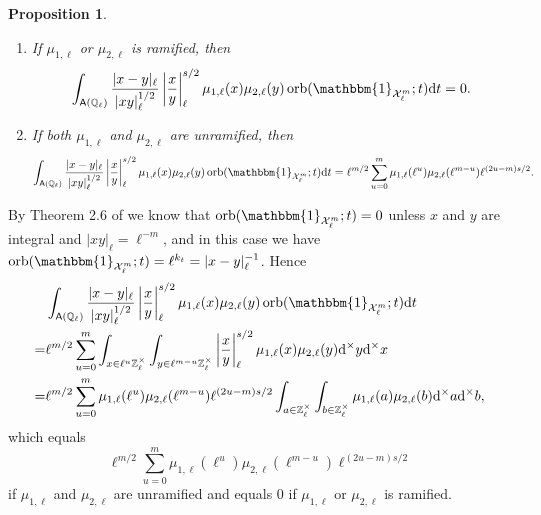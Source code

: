 \documentclass[10pt,oneside,reqno]{amsart}
\makeatletter
\newcommand\rmd{\mathrm{d}}
\newcommand\cX{\mathcal{X}}
\newcommand\QQ{\mathbb{Q}}
\newcommand\ZZ{\mathbb{Z}}
\newcommand\A{\mathsf{A}}
\newcommand\triv{\mathbbm{1}}
\DeclareMathOperator\orb{orb}
\theoremstyle{THEOREM}
\newtheorem{proposition}[theorem]{Proposition}
\theoremstyle{DEFINITION}
\theoremstyle{EXERCISE}
\numberwithin{equation}{section}
\renewenvironment{proof}[1][\proofname]{\par
  \vspace{-6pt}
  \pushQED{\qed}
  \normalfont \topsep6\p@\@plus6\p@\relax
  \trivlist
  \item[\hskip\labelsep\rmfamily\bfseries
    #1\@addpunct{:}]\ignorespaces
}{
  \popQED\endtrivlist\@endpefalse
  \vspace{-6pt}
}
\makeatother
\begin{document}
\begin{proposition}\label{prop:unramifiedtraceeisenstein}
\begin{enumerate}[itemsep=0pt,parsep=0pt,topsep=0pt,leftmargin=0pt,labelsep=2.5pt,itemindent=15pt,label=\upshape{(\arabic*)}]
  \item If $\mu_{1,\ell}$ or $\mu_{2,\ell}$ is ramified, then
  \[
  \int_{ \A(\QQ_\ell)}\frac{|x-y|_\ell}{|xy|_\ell^{1/2}}\left|\frac xy\right|_\ell^{s/2}\mu_{1,\ell}(x)\mu_{2,\ell}(y)\orb(\triv_{\cX_\ell^{m}};t)\rmd t=0.
  \]
  \item If both $\mu_{1,\ell}$ and $\mu_{2,\ell}$ are unramified, then
  \[
  \int_{\A(\QQ_\ell)}\frac{|x-y|_\ell}{|xy|_\ell^{1/2}}\left|\frac xy\right|_\ell^{s/2}\mu_{1,\ell}(x)\mu_{2,\ell}(y)\orb(\triv_{\cX_\ell^{m}};t)\rmd t=\ell^{m/2}\sum_{u=0}^{m}\mu_{1,\ell}(\ell^u)\mu_{2,\ell}(\ell^{m-u})\ell^{(2u-m)s/2}.
  \]
\end{enumerate} 
\end{proposition}
\begin{proof}
By Theorem 2.6 of \cite{cheng2025} we know that $\orb(\triv_{\cX_\ell^{m}};t)=0$ unless $x$ and $y$ are integral and $|xy|_\ell=\ell^{-m}$, and in this case we have  $\orb(\triv_{\cX_\ell^{m}};t)=\ell^{k_t}=|x-y|_\ell^{-1}$. Hence
\begin{align*}
  &\int_{ \A(\QQ_\ell)}\frac{|x-y|_\ell}{|xy|_\ell^{1/2}}\left|\frac xy\right|_\ell^{s/2}\mu_{1,\ell}(x)\mu_{2,\ell}(y)\orb(\triv_{\cX_\ell^{m}};t)\rmd t\\
  =&\ell^{m/2}\sum_{u=0}^{m}\int_{x\in \ell^u\ZZ_\ell^\times}\int_{y\in \ell^{m-u}\ZZ_\ell^\times}\left|\frac xy\right|_\ell^{s/2}\mu_{1,\ell}(x)\mu_{2,\ell}(y)\rmd^\times y\rmd^\times x\\
  =&\ell^{m/2}\sum_{u=0}^{m}\mu_{1,\ell}(\ell^u)\mu_{2,\ell}(\ell^{m-u})\ell^{(2u-m)s/2}\int_{a\in\ZZ_\ell^\times}\int_{b\in \ZZ_\ell^\times}\mu_{1,\ell}(a)\mu_{2,\ell}(b)\rmd^\times a\rmd^\times b,
\end{align*}
which equals 
\[
\ell^{m/2}\sum_{u=0}^{m}\mu_{1,\ell}(\ell^u)\mu_{2,\ell}(\ell^{m-u})\ell^{(2u-m)s/2}
\] 
if $\mu_{1,\ell}$ and $\mu_{2,\ell}$ are unramified and equals $0$ if $\mu_{1,\ell}$ or $\mu_{2,\ell}$ is ramified.
\end{proof}
\end{document}
